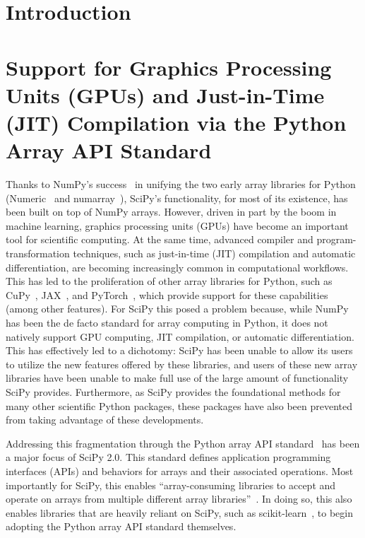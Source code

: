 \documentclass[acmsmall]{acmart}
\begin{document}

\maketitle


\section{Introduction}

\section{Support for Graphics Processing Units (GPUs) and Just-in-Time (JIT) Compilation
via the Python Array API Standard}\label{sec:array-api}

Thanks to NumPy's success~\cite{Harris2020} in unifying the two early array libraries for
Python (Numeric~\cite{Dubois1996,ascher2000numerical} and
numarray~\cite{Greenfield2003numarrayA}), SciPy's functionality, for most of its
existence, has been built on top of NumPy arrays. However, driven in part
by the boom in machine learning, graphics processing units (GPUs) have become an
important tool for scientific computing. At the same time, advanced compiler and
program-transformation techniques, such as just-in-time (JIT) compilation
and automatic differentiation, are becoming increasingly common in computational
workflows. This has led to the proliferation of other
array libraries for Python, such as CuPy~\cite{cupy_learningsys2017},
JAX~\cite{jax2018github}, and PyTorch~\cite{Ansel2024}, which provide support for these
capabilities (among other features). For SciPy this posed a problem because, while NumPy
has been the de facto standard for array computing in Python, it does not natively
support GPU computing, JIT compilation, or automatic differentiation.
This has effectively led to a dichotomy: SciPy has been unable to allow its users to
utilize the new features offered by these libraries, and users of these new array
libraries have been unable to make full use of the large amount of functionality SciPy
provides. Furthermore, as SciPy provides the foundational methods for many other
scientific Python packages, these packages have also been prevented from taking
advantage of these developments.

Addressing this fragmentation through the Python array API standard~\cite{Meurer2023} has been a
major focus of SciPy 2.0. This standard defines application
programming interfaces (APIs) and behaviors for arrays and their
associated operations. Most importantly for SciPy, this enables
``array-consuming libraries to accept and operate on arrays from multiple different
array libraries''~\cite{Meurer2023}. In doing so, this also enables libraries that are
heavily reliant on SciPy, such as scikit-learn~\cite{scikit-learn,sklearn_api}, to
begin adopting the Python array API standard themselves.
\end{document}
